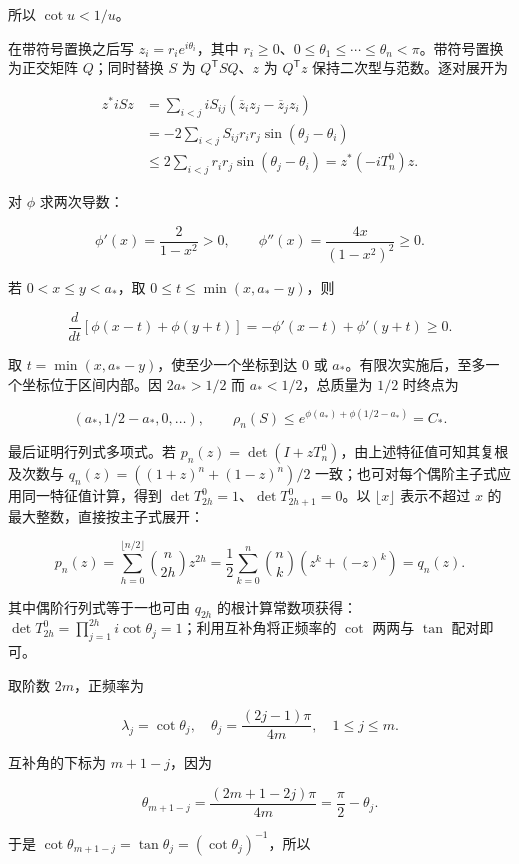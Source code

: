 \documentclass[11pt,a4paper]{article}
\begin{document}
所以 \(\cot u<1/u\)。

在带符号置换之后写 \(z_i=r_ie^{i\theta_i}\)，其中 \(r_i\ge0\)、\(0\le\theta_1\le\cdots\le\theta_n<\pi\)。带符号置换为正交矩阵 \(Q\)；同时替换 \(S\) 为 \(Q^{\mathsf T}SQ\)、\(z\) 为 \(Q^{\mathsf T}z\) 保持二次型与范数。逐对展开为

\[\begin{aligned}
z^*iSz&=\sum_{i<j}iS_{ij}(\overline z_i z_j-\overline z_jz_i)\\
&=-2\sum_{i<j}S_{ij}r_ir_j\sin(\theta_j-\theta_i)\\
&\le2\sum_{i<j}r_ir_j\sin(\theta_j-\theta_i)=z^*(-iT_n^0)z.
\end{aligned}\]

对 \(\phi\) 求两次导数：

\[\phi'(x)=\frac2{1-x^2}>0,\qquad
\phi''(x)=\frac{4x}{(1-x^2)^2}\ge0.\]

若 \(0<x\le y<a_*\)，取 \(0\le t\le\min(x,a_*-y)\)，则

\[\frac{d}{dt}[\phi(x-t)+\phi(y+t)]
=-\phi'(x-t)+\phi'(y+t)\ge0.\]

取 \(t=\min(x,a_*-y)\)，使至少一个坐标到达 \(0\) 或 \(a_*\)。有限次实施后，至多一个坐标位于区间内部。因 \(2a_*>1/2\) 而 \(a_*<1/2\)，总质量为 \(1/2\) 时终点为

\[(a_*,1/2-a_*,0,\ldots),\qquad
\rho_n(S)\le e^{\phi(a_*)+\phi(1/2-a_*)}=C_*.\]

最后证明行列式多项式。若 \(p_n(z)=\det(I+zT_n^0)\)，由上述特征值可知其复根及次数与 \(q_n(z)=((1+z)^n+(1-z)^n)/2\) 一致；也可对每个偶阶主子式应用同一特征值计算，得到 \(\det T_{2h}^0=1\)、\(\det T_{2h+1}^0=0\)。以 \(\lfloor x\rfloor\) 表示不超过 \(x\) 的最大整数，直接按主子式展开：

\[p_n(z)=\sum_{h=0}^{\lfloor n/2\rfloor}\binom n{2h}z^{2h}
=\frac12\sum_{k=0}^n\binom nk(z^k+(-z)^k)=q_n(z).\]

其中偶阶行列式等于一也可由 \(q_{2h}\) 的根计算常数项获得：\(\det T_{2h}^0=\prod_{j=1}^{2h}i\cot\theta_j=1\)；利用互补角将正频率的 \(\cot\) 两两与 \(\tan\) 配对即可。

取阶数 \(2m\)，正频率为

\[\lambda_j=\cot\theta_j,\quad
\theta_j=\frac{(2j-1)\pi}{4m},\quad1\le j\le m.\]

互补角的下标为 \(m+1-j\)，因为

\[\theta_{m+1-j}=\frac{(2m+1-2j)\pi}{4m}
=\frac\pi2-\theta_j.\]

于是 \(\cot\theta_{m+1-j}=\tan\theta_j=(\cot\theta_j)^{-1}\)，所以
\end{document}
